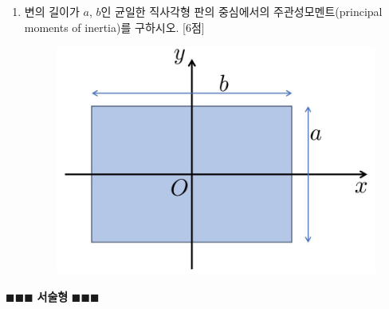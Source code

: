 \documentclass[a4paper,11pt,fleqn]{article}   %
\newcommand{\n}{\newline}
\begin{document}
\begin{enumerate}[start=12]
	
	\item 변의 길이가 $a$, $b$인 균일한 직사각형 판의 중심에서의 주관성모멘트(principal moments of inertia)를 구하시오.  [6점]
	\begin{figure}[h]
		\begin{center}
			\includegraphics[scale=0.3]{img/rectangle}
		\end{center}
	\end{figure}
\n\n\n
	
\end{enumerate}

\begin{center}
$\blacksquare \blacksquare \blacksquare$ \textbf{서술형} $\blacksquare \blacksquare \blacksquare$
\end{center}
\end{document}

